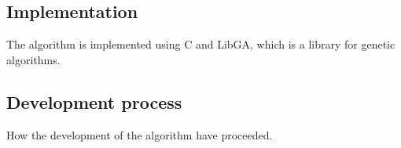 \subsection{Implementation}
The algorithm is implemented using C and LibGA, which is a library for genetic algorithms.

\subsection{ Development process}
How the development of the algorithm have proceeded.\\
